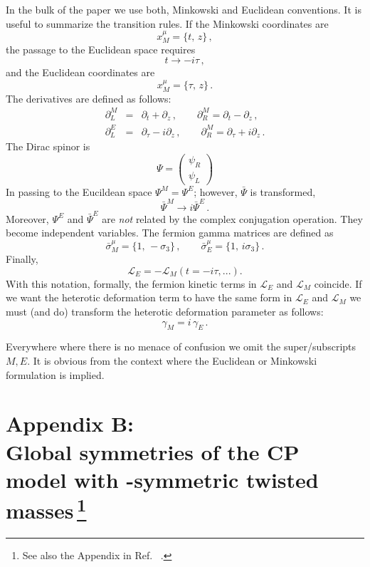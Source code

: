 \documentclass[epsfig,12pt]{article}
\def\beq{\begin{equation}}
\def\eeq{\end{equation}}
\def\beqn{\begin{eqnarray}}
\def\eeqn{\end{eqnarray}}
\newcommand{\cell}{{\mathcal L}}
\newcommand{\pt}{\partial}
\renewcommand{\theequation}{\thesection.\arabic{equation}}
\def\beqn{\begin{eqnarray}}
\def\eeqn{\end{eqnarray}}
\def\beq{\begin{equation}}
\def\eeq{\end{equation}}
\renewcommand{\theequation}{\thesection.\arabic{equation}}
\begin{document}
{In the bulk of the paper we use both, Minkowski and Euclidean conventions.
It is useful to summarize the transition rules.
If the Minkowski coordinates are
\beq
x^\mu_M =\{t,\,z\}\,,
\label{appeone}
\eeq
the passage to the Euclidean space requires
\beq
t \to - i\tau\,,
\label{appe2}
\eeq
and the Euclidean coordinates are
\beq
x^\mu_M =\{\tau,\,z\}\,.
\label{appe3}
\eeq
The derivatives are defined as follows:
\beqn
\pt_L^M &=& \pt_t+\pt_z\,,\qquad \pt_R^M = \pt_t- \pt_z\,,
\nonumber\\[2mm]
\pt_L^E &=& \pt_\tau - i \pt_z\,,\qquad \pt_R^M = \pt_\tau + i \pt_z\,.
\label{appe4}
\eeqn
The Dirac spinor is
\beq
\Psi =\left(
\begin{array}{c}
\psi_R\\[1mm]
\psi_L
\end{array}
\right)
\label{appe5}
\eeq
In passing to the Eucildean space $\Psi^M = \Psi^E$;
however, $\bar\Psi$ is transformed,
\beq
\bar\Psi^M \to i \bar \Psi^E\,.
\label{appe6}
\eeq
Moreover, $\Psi^E$ and $\bar \Psi^E$ are {\em not} related by the complex conjugation operation.
They become independent variables. The fermion gamma matrices are defined as
\beq
\bar\sigma^\mu_M =\{1,\,-\sigma_3\}\,,\qquad \bar\sigma^\mu_E =\{1,\, i\sigma_3\}\,.
\label{appe7}
\eeq
Finally, 
\beq
\cell_E =- \cell_M (t=-i\tau , ...).
\eeq
With this notation, formally, the fermion kinetic terms in $\cell_E $ and $\cell_M $
coincide.
If we want the heterotic deformation term to have the same form in
$\cell_E $ and $\cell_M $ we must (and do) transform the heterotic deformation parameter as follows:
\beq
\gamma_M = i\,\gamma_E\,.
\label{appe8}
\eeq

Everywhere where there is no menace of confusion we omit the super/sub\-scripts $M,E$.
It is obvious from the context where the Euclidean or Minkowski formulation is implied.


\section*{Appendix B: \\
Global symmetries of the CP model with -symmetric
 twisted masses\,\footnote{See also the Appendix in Ref.~ \cite{Shifman:2009ay}.}}
 \renewcommand{\theequation}{B.\arabic{equation}}
\setcounter{equation}{0}
 
 \renewcommand{\thesubsection}{B.\arabic{subsection}}
\setcounter{subsection}{0}

}
\end{document}

